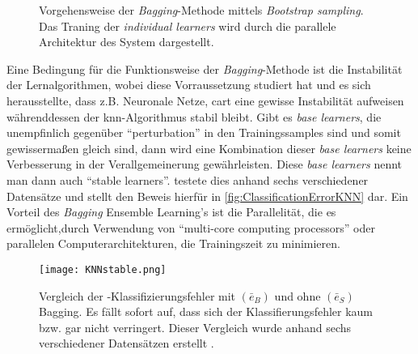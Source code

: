 \begin{figure}[h]
    \caption{Vorgehensweise der \textit{Bagging}-Methode mittels \textit{Bootstrap sampling}. Das Traning der \textit{individual learners} wird durch die parallele Architektur des System dargestellt.}
    \label{fig:bagging}
\end{figure}

Eine Bedingung für die Funktionsweise der \textit{Bagging}-Methode ist die Instabilität der Lernalgorithmen, wobei \citeauthor[]{Breiman.1996} diese Vorraussetzung studiert hat und es sich herausstellte, dass z.B. Neuronale Netze, \gls{cart} eine gewisse Instabilität aufweisen währenddessen der \gls{knn}-Algorithmus stabil bleibt. Gibt es \textit{base learners}, die unempfinlich gegenüber \enquote{perturbation}\autocite[S.51]{Zhou.2012} in den Trainingssamples sind und somit gewissermaßen gleich sind, dann wird eine Kombination dieser \textit{base learners} keine Verbesserung in der Verallgemeinerung gewährleisten. Diese \textit{base learners} nennt man dann auch \enquote{stable learners}\autocite[S.51]{Zhou.2012}. \citeauthor[]{Breiman.1996} testete dies anhand sechs verschiedener Datensätze und stellt den Beweis hierfür in \autoref{fig:ClassificationErrorKNN} dar.
Ein Vorteil des \textit{Bagging} Ensemble Learning's ist die Parallelität, die es ermöglicht,durch Verwendung von \enquote{multi-core computing processors}\autocite[S.48]{Zhou.2021} oder parallelen Computerarchitekturen, die Trainingszeit zu minimieren.

\begin{figure}[h]
    \centering
    \texttt{[image: KNNstable.png]}
    \caption{Vergleich der -Klassifizierungsfehler mit $(\bar{e}_B)$ und ohne $(\bar{e}_S)$ Bagging. Es fällt sofort auf, dass sich der Klassifierungsfehler kaum bzw. gar nicht verringert. Dieser Vergleich wurde anhand sechs verschiedener Datensätzen erstellt \autocite[vgl.S.14]{Breiman.1996}.}
    \label{fig:ClassificationErrorKNN}
\end{figure}
    
